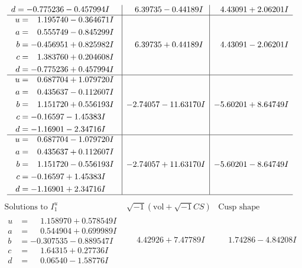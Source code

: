 \documentclass[1p]{elsarticle_modified}
\theoremstyle{definition}
\newcommand{\I}{\sqrt{-1}}
\begin{document}
$$\begin{array}{c|c|c}
\begin{aligned}
d &= -0.775236 - 0.457994 I\end{aligned}
 & \phantom{-}6.39735 - 0.44189 I & \phantom{-}4.43091 + 2.06201 I \\ \hline\begin{aligned}
u &= \phantom{-}1.195740 - 0.364671 I \\
a &= \phantom{-}0.555749 - 0.845299 I \\
b &= -0.456951 + 0.825982 I \\
c &= \phantom{-}1.383760 + 0.204608 I \\
d &= -0.775236 + 0.457994 I\end{aligned}
 & \phantom{-}6.39735 + 0.44189 I & \phantom{-}4.43091 - 2.06201 I \\ \hline\begin{aligned}
u &= \phantom{-}0.687704 + 1.079720 I \\
a &= \phantom{-}0.435637 - 0.112607 I \\
b &= \phantom{-}1.151720 + 0.556193 I \\
c &= -0.16597 - 1.45383 I \\
d &= -1.16901 - 2.34716 I\end{aligned}
 & -2.74057 - 11.63170 I & -5.60201 + 8.64749 I \\ \hline\begin{aligned}
u &= \phantom{-}0.687704 - 1.079720 I \\
a &= \phantom{-}0.435637 + 0.112607 I \\
b &= \phantom{-}1.151720 - 0.556193 I \\
c &= -0.16597 + 1.45383 I \\
d &= -1.16901 + 2.34716 I\end{aligned}
 & -2.74057 + 11.63170 I & -5.60201 - 8.64749 I\\
 \hline 
 \end{array}$$\newpage$$\begin{array}{c|c|c}  
\text{Solutions to }I^u_{1}& \I (\text{vol} + \sqrt{-1}CS) & \text{Cusp shape}\\
 \hline 
\begin{aligned}
u &= \phantom{-}1.158970 + 0.578549 I \\
a &= \phantom{-}0.544904 + 0.699989 I \\
b &= -0.307535 - 0.889547 I \\
c &= \phantom{-}1.64315 + 0.27736 I \\
d &= \phantom{-}0.06540 - 1.58776 I\end{aligned}
 & \phantom{-}4.42926 + 7.47789 I & \phantom{-}1.74286 - 4.84208 I \\ \hline\begin{aligned}

\end{aligned}
\end{array}$$
\end{document}

